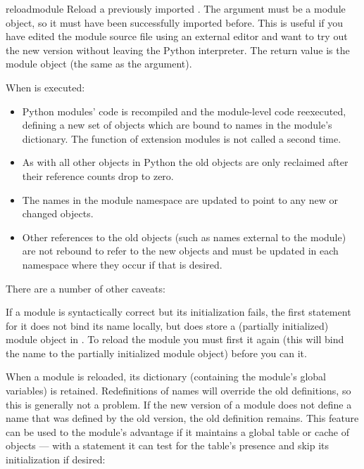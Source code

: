 \begin{funcdesc}{reload}{module}
  Reload a previously imported .  The
  argument must be a module object, so it must have been successfully
  imported before.  This is useful if you have edited the module
  source file using an external editor and want to try out the new
  version without leaving the Python interpreter.  The return value is
  the module object (the same as the  argument).

  When  is executed:

\begin{itemize}

    \item{Python modules' code is recompiled and the module-level code
    reexecuted, defining a new set of objects which are bound to names in
    the module's dictionary.  The  function of extension
    modules is not called a second time.}

    \item{As with all other objects in Python the old objects are only
    reclaimed after their reference counts drop to zero.}

    \item{The names in the module namespace are updated to point to
    any new or changed objects.}

    \item{Other references to the old objects (such as names external
    to the module) are not rebound to refer to the new objects and
    must be updated in each namespace where they occur if that is
    desired.}

\end{itemize}

  There are a number of other caveats:

  If a module is syntactically correct but its initialization fails,
  the first  statement for it does not bind its name
  locally, but does store a (partially initialized) module object in
  .  To reload the module you must first
   it again (this will bind the name to the partially
  initialized module object) before you can  it.

  When a module is reloaded, its dictionary (containing the module's
  global variables) is retained.  Redefinitions of names will override
  the old definitions, so this is generally not a problem.  If the new
  version of a module does not define a name that was defined by the
  old version, the old definition remains.  This feature can be used
  to the module's advantage if it maintains a global table or cache of
  objects --- with a  statement it can test for the
  table's presence and skip its initialization if desired:


\end{funcdesc}
